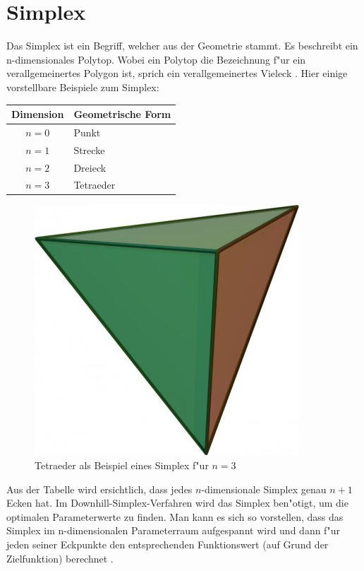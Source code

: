 \section{Simplex}
Das Simplex ist ein Begriff, welcher aus der Geometrie stammt. Es
beschreibt ein n-dimensionales Polytop. Wobei ein Polytop die Bezeichnung
f"ur ein verallgemeinertes Polygon ist, sprich ein verallgemeinertes
Vieleck \cite{bib:link4}. 
Hier einige vorstellbare Beispiele zum Simplex:
 
\begin{center}
\begin{tabular}{c|l}
Dimension & Geometrische Form\\
\hline
$n=0$ & Punkt\\
$n=1$ & Strecke\\
$n=2$ & Dreieck\\
$n=3$ & Tetraeder
\end{tabular}
\end{center}

\begin{figure}
\centering
\includegraphics[height=0.25\textwidth]{downhill/tetraeder.jpg}
\caption{Tetraeder als Beispiel eines Simplex f"ur $n=3$}
\end{figure}

Aus der Tabelle wird ersichtlich, dass jedes $n$-dimensionale Simplex genau $n+1$ Ecken hat.
Im Downhill-Simplex-Verfahren wird das Simplex ben"otigt, um die
optimalen Parameterwerte zu finden. Man kann es sich so vorstellen,
dass das Simplex im n-dimensionalen Parameterraum aufgespannt wird und
dann f"ur jeden seiner Eckpunkte den entsprechenden Funktionswert (auf
Grund der Zielfunktion) berechnet \cite{bib:link3}.
